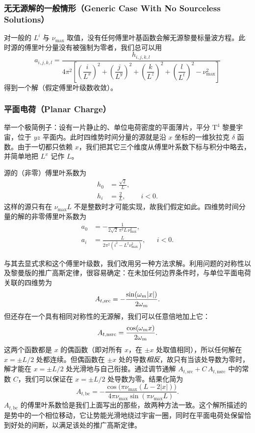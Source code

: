 \subsubsection{无无源解的一般情形（Generic Case With No Sourceless Solutions）}

对一般的 $L^{i}$ 与 $\nu_{\max}$ 取值，没有任何傅里叶基函数会解无源黎曼标量波方程。此时源的傅里叶分量没有被强制为零者，我们总可以用
\begin{equation}
a_{i,j,k,l} = \frac{h_{i,j,k,l}}{4\pi^{2}\left[\left(\dfrac{i}{L^{x}}\right)^{2}+\left(\dfrac{j}{L^{y}}\right)^{2}+\left(\dfrac{k}{L^{z}}\right)^{2}+\left(\dfrac{l}{L^{t}}\right)^{2}-\nu_{\max}^{2}\right]}
\end{equation}
得到一个解（假定傅里叶级数收敛）。

\subsubsection{平面电荷（Planar Charge）}

举一个极简例子：设有一片静止的、单位电荷密度的平面薄片，平分 $\text{T}^{4}$ 黎曼宇宙，位于 $yz$ 平面内。此时四维势时间分量的源就是沿 $x$ 坐标的一维狄拉克 $\delta$ 函数。由于一切都只依赖 $x$，我们把其它三个维度从傅里叶系数下标与积分中略去，并简单地把 $L^{x}$ 记作 $L$。

源的（非零）傅里叶系数为
\begin{align}
h_{0} &= \frac{\sqrt2}{L},\\
h_{i} &= \frac{2}{L}, && i<0.
\end{align}
这样的源只有在 $\nu_{\max}L$ 不是整数时才可能实现，故我们假定如此。四维势时间分量的解的非零傅里叶系数为
\begin{align}
a_{0} &= -\frac{1}{2\sqrt2\,\pi^{2} L\,\nu_{\max}^{2}},\\
a_{i} &= \frac{L}{2\pi^{2}(i^{2}-L^{2}\nu_{\max}^{2})}, && i<0.
\end{align}

与其去显式求和这个傅里叶级数，我们改用另一种方法求解。利用问题的对称性以及黎曼版的推广高斯定律，很容易确定：在未加任何边界条件时，与单位平面电荷关联的四维势为
\begin{equation}
A_{t,\text{src}} = -\frac{\sin(\omega_m|x|)}{2\omega_m}.
\end{equation}
但还存在一个具有相同对称性的无源解，我们可以任意倍地加上它：
\begin{equation}
A_{t,\text{nsrc}} = \frac{\cos(\omega_m x)}{2\omega_m}.
\end{equation}
这两个函数都是 $x$ 的偶函数（即对所有 $x$，在 $\pm x$ 处取值相同），所以任何解在 $x=\pm L/2$ 处都连续。但偶函数在 $\pm x$ 处的导数\emph{相反}，故只有当该处导数为零时，解才能在 $x=\pm L/2$ 处光滑地与自己衔接。通过调节通解 $A_{t,\text{src}}+C\,A_{t,\text{nsrc}}$ 中的常数 $C$，我们可以保证在 $x=\pm L/2$ 处导数为零。结果化简为
\begin{equation}
A_{t,\text{bc}} = -\frac{\cos\!\bigl(\pi\nu_{\max}(L-2|x|)\bigr)}{4\pi\nu_{\max}\sin(\pi\nu_{\max}L)}.
\end{equation}
$A_{t,\text{bc}}$ 的傅里叶系数恰是我们上面写出的那些，故两种方法一致。这个解所描述的是势中的一个相位移动，它让势能光滑地绕过宇宙一圈，同时在平面电荷处保留恰到好处的间断，以满足该处的推广高斯定律。

